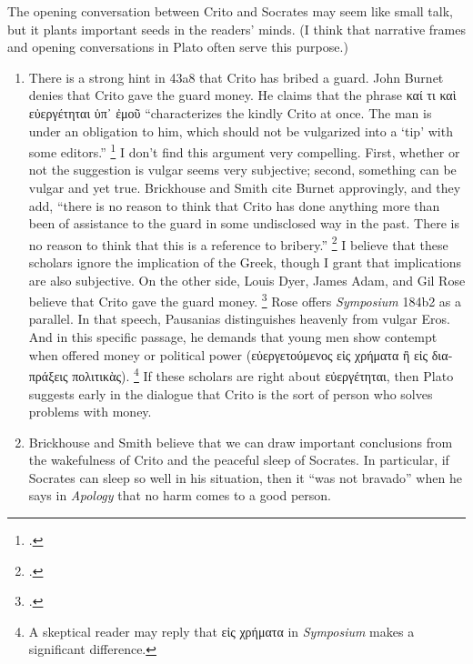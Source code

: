 \documentclass[12pt,letterpaper]{article}
\begin{document}
The opening conversation between Crito and Socrates may seem like small talk, but it plants important seeds in the readers' minds.
(I think that narrative frames and opening conversations in Plato often serve this purpose.)

\begin{enumerate}

    \item There is a strong hint in 43a8 that Crito has bribed a guard.
        John Burnet denies that Crito gave the guard money.
        He claims that the phrase \textgreek{καί τι καὶ εὐεργέτηται ὑπ᾽ ἐμοῦ} ``characterizes the kindly Crito at once.
        The man is under an obligation to him, which should not be vulgarized into a `tip' with some editors.''%
        \footcite[][on 43a8]{burnet1924-euthyphro-apology-crito} I don't find this argument very compelling.
        First, whether or not the suggestion is vulgar seems very subjective; second, something can be vulgar and yet true.
        Brickhouse and Smith cite Burnet approvingly, and they add, ``there is no reason to think that Crito has done anything more than been of assistance to the guard in some undisclosed way in the past.
        There is no reason to think that this is a reference to bribery.''%
        \footcite[][249]{brickhouse-smith2004-plato-trial-of-socrates}  I believe that these scholars ignore the implication of the Greek, though I grant that implications are also subjective.
        On the other side, Louis Dyer, James Adam, and Gil Rose believe that Crito gave the guard money.
        \footcites[][on 43a9]{dyer-apology-crito-2007}[][on 43a9]{adam1988-crito}[][on 43a8]{rose-crito-1983}
        Rose offers \textit{Symposium} 184b2 as a parallel.
        In that speech, Pausanias distinguishes heavenly from vulgar Eros.
        And in this specific passage, he demands that young men show contempt when offered money or political power (\textgreek{εὐεργετούμενος εἰς χρήματα ἢ εἰς διαπράξεις πολιτικὰς}).%
        \footnote{A skeptical reader may reply that \textgreek{εἰς χρήματα} in \textit{Symposium} makes a significant difference.}
        If these scholars are right about \textgreek{εὐεργέτηται}, then Plato suggests early in the dialogue that Crito is the sort of person who solves problems with money.
    \item Brickhouse and Smith believe that we can draw important conclusions from the wakefulness of Crito and the peaceful sleep of Socrates.
        In particular, if Socrates can sleep so well in his situation, then it ``was not bravado'' when he says in \textit{Apology} that no harm comes to a good person.%

\end{enumerate}
\end{document}
